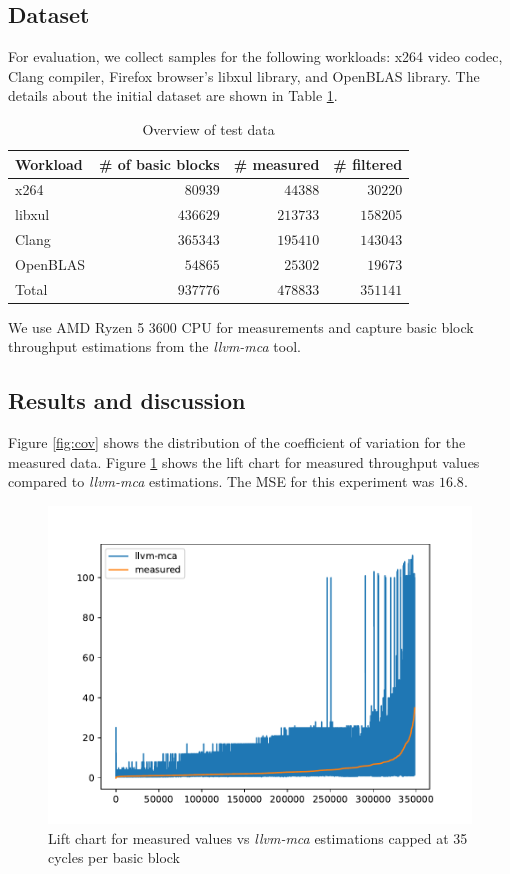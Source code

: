 \subsection{Dataset}
For evaluation, we collect samples for the following workloads: x264 video codec, Clang compiler, 
Firefox browser's libxul library, and OpenBLAS library. The details about the initial dataset are 
shown in Table \ref{tab:test_data}.

\begin{table}[htbp]
  \caption{Overview of test data}
  \label{tab:test_data}
  \begin{tabular}{lrrr}
  \hline
  Workload & \# of basic blocks & \# measured & \# filtered \\
  \hline
  x264     & $80939$              & $44388$       & $30220$       \\
  libxul   & $436629$             & $213733$      & $158205$      \\
  Clang    & $365343$             & $195410$      & $143043$      \\
  OpenBLAS & $54865$              & $25302$       & $19673$       \\
  Total    & $937776$             & $478833$      & $351141$
  \end{tabular}
\end{table}

We use AMD Ryzen 5 3600 CPU for measurements and capture basic block throughput
estimations from the \textit{llvm-mca} tool.

\subsection{Results and discussion}
Figure \ref{fig:cov} shows the distribution of the coefficient of variation for
the measured data. Figure \ref{fig:lift_chart} shows the lift chart for measured
throughput values compared to \textit{llvm-mca} estimations. The MSE for this
experiment was $16.8$.

\begin{figure}[h]
  \centering
  \includegraphics[width=0.9\columnwidth]{lift_chart_35_cycles}
  \caption{Lift chart for measured values vs \textit{llvm-mca} estimations capped at 35 cycles per basic block}
  \label{fig:lift_chart}
\end{figure}

